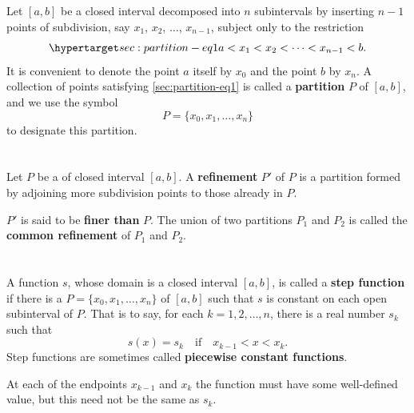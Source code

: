 \documentclass{report}
\begin{document}
  Let $[a, b]$ be a closed interval decomposed into $n$ subintervals by
    inserting $n - 1$ points of subdivision, say $x_1$, $x_2$, $\ldots$,
    $x_{n-1}$, subject only to the restriction
    \begin{equation}
      \hyperlabel{sec:partition-eq1}
      a < x_1 < x_2 < \cdots < x_{n-1} < b.
    \end{equation}
  It is convenient to denote the point $a$ itself by $x_0$ and the point $b$ by
    $x_n$.
  A collection of points satisfying \eqref{sec:partition-eq1} is called a
    \textbf{partition} $P$ of $[a, b]$, and we use the symbol
    $$P = \{x_0, x_1, \ldots, x_n\}$$ to designate this partition.


\section{}%

  Let $P$ be a  of closed interval $[a, b]$.
  A \textbf{refinement} $P'$ of $P$ is a partition formed by adjoining more
    subdivision points to those already in $P$.

  $P'$ is said to be \textbf{finer than} $P$. The union of two partitions $P_1$
    and $P_2$ is called the \textbf{common refinement} of $P_1$ and $P_2$.

\section{}%

  A function $s$, whose domain is a closed interval $[a, b]$, is called a
    \textbf{step function} if there is a 
    $P = \{x_0, x_1, \ldots, x_n\}$ of $[a, b]$ such that $s$ is constant on each
    open subinterval of $P$.
  That is to say, for each $k = 1, 2, \ldots, n$, there is a real number $s_k$
    such that $$s(x) = s_k \quad\text{if}\quad x_{k-1} < x < x_k.$$
    Step functions are sometimes called \textbf{piecewise constant functions}.

  \begin{note}
    At each of the endpoints $x_{k-1}$ and $x_k$ the function must have some
      well-defined value, but this need not be the same as $s_k$.
  \end{note}

\end{document}
